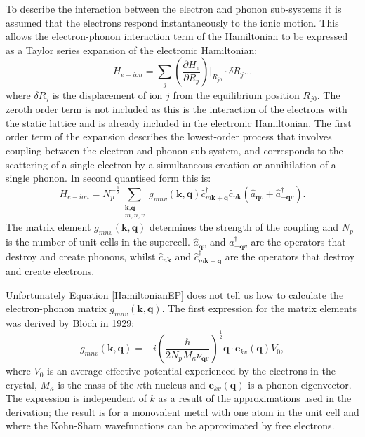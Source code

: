 To describe the interaction between the electron and phonon sub-systems it is assumed that the electrons respond instantaneously to the ionic motion.
This allows the electron-phonon interaction term of the Hamiltonian to be expressed as a Taylor series expansion of the electronic Hamiltonian:\autocite{Cardona2010}
\begin{equation}
H_{e-ion} = \sum_j\left(\frac{\partial H_e}{\partial R_j}\right)\rvert_{R_{j0}}\cdot\delta R_j\ldots
\end{equation}
where $\delta R_j$ is the displacement of ion $j$ from the equilibrium position $R_{j0}$.
The zeroth order term is not included as this is the interaction of the electrons with the static lattice and is already included in the electronic Hamiltonian.
The first order term of the expansion describes the lowest-order process that involves coupling between the electron and phonon sub-system, and corresponds to the scattering of a single electron by a simultaneous creation or annihilation of a single phonon.
In second quantised form this is:\autocite{Giustino2017}
\begin{equation} \label{HamiltonianEP}
H_{e-ion} = N_p^{-\frac{1}{2}}\sum_{\substack{\textbf{k},\textbf{q} \\ m,n,v}}g_{mnv}(\textbf{k},\textbf{q})\hat{c}^{\dagger}_{m\textbf{k}+\textbf{q}}\hat{c}_{n\textbf{k}}(\hat{a}_{\textbf{q}v}+\hat{a}^{\dagger}_{-\textbf{q}v}).
\end{equation}
The matrix element $g_{mnv}(\textbf{k},\textbf{q})$ determines the strength of the coupling and $N_p$ is the number of unit cells in the supercell. $\hat{a}_{\textbf{q}v}$ and $\hat{a}^{\dagger}_{-\textbf{q}v}$ are the operators that destroy and create phonons, whilst
$\hat{c}_{n\textbf{k}}$ and $\hat{c}^{\dagger}_{m\textbf{k}+\textbf{q}}$ are the operators that destroy and create electrons.

Unfortunately Equation \ref{HamiltonianEP} does not tell us how to calculate the electron-phonon matrix $g_{mnv}(\textbf{k},\textbf{q})$. The first expression for the matrix elements was derived by Bl\"{o}ch in 1929:\autocite{Giustino2017}
\begin{equation}
g_{mnv}(\textbf{k},\textbf{q}) = -i\left(\frac{\hbar}{2N_pM_\kappa\nu_{\textbf{q}v}}\right)^{\frac{1}{2}}\textbf{q}\cdot\textbf{e}_{kv}(\textbf{q})V_0,
\end{equation}
where $V_0$ is an average effective potential experienced by the electrons in the crystal, $M_\kappa$ is the mass of the $\kappa$th nucleus and $\textbf{e}_{kv}(\textbf{q})$ is a phonon eigenvector. The expression is independent of $k$ as a result of the approximations used in the derivation; the result is for a monovalent metal with one atom in the unit cell and where the Kohn-Sham wavefunctions can be approximated by free electrons.\autocite{Giustino2017,Wallis1963}%

